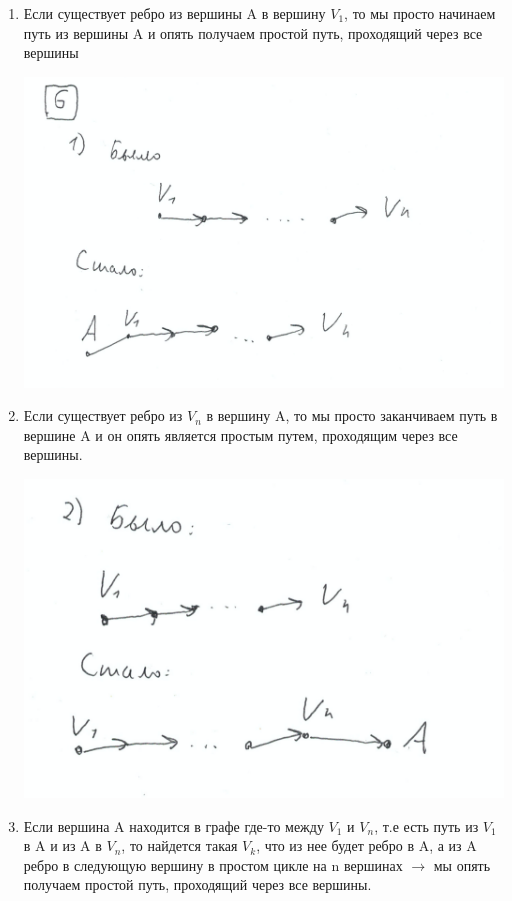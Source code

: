 \documentclass[a4paper,12pt]{article}
\begin{document}
\begin{enumerate}
\item Если существует ребро из вершины A в вершину $V_1$, то мы просто начинаем путь из вершины A и опять получаем простой путь, проходящий через все вершины
\begin{center}
\includegraphics[scale=0.35]{6.1.png}
\end{center}
\item Если существует ребро из $V_n$ в  вершину A, то мы просто заканчиваем путь в вершине A и он опять является простым путем, проходящим через все вершины.
\begin{center}
\includegraphics[scale=0.4]{6.2.png}
\end{center}
\newpage
\item Если вершина A находится в графе где-то между $V_1$ и $V_n$, т.е есть путь из $V_1$ в A и из A в $V_n$, то найдется такая $V_k$, что из нее будет ребро в A, а из A ребро в следующую вершину в простом цикле на n вершинах $\rightarrow$ мы опять получаем простой путь, проходящий через все вершины.

\end{enumerate}
\end{document}

